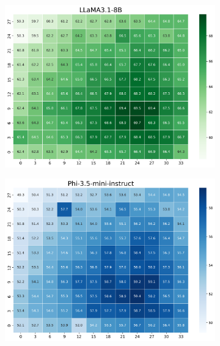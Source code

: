 \documentclass[11pt]{article}
\begin{document}
\begin{figure}[h]
    \centering
    
    \begin{subfigure}[b]{0.3\linewidth}  %
        \centering
        \includegraphics[width=\linewidth]{picture/figure3_LLaMA3.1.png}
    \end{subfigure}
    \begin{subfigure}[b]{0.3\linewidth}
        \centering
        \includegraphics[width=\linewidth]{picture/figure3_Phi3.5-mini.png}
    \end{subfigure}
    \begin{subfigure}[b]{0.3\linewidth}

\end{subfigure}
\end{figure}
\end{document}
